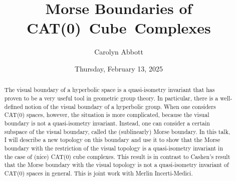 \documentclass{UAmathtalk}
\author{Carolyn Abbott}
\title{Morse Boundaries of CAT(0)~Cube~Complexes}
\date{Thursday, February 13, 2025}
\begin{document}
\maketitle

\begin{abstract}
The visual boundary of a hyperbolic space is a quasi-isometry invariant that has proven to be a very useful tool in geometric group theory. In particular, there is a well-defined notion of the visual boundary of a hyperbolic group. When one considers CAT(0) spaces, however, the situation is more complicated, because the visual boundary is not a quasi-isometry invariant. Instead, one can consider a certain subspace of the visual boundary, called the (sublinearly) Morse boundary. In this talk, I will describe a new topology on this boundary and use it to show that the Morse boundary with the restriction of the visual topology is a quasi-isometry invariant in the case of (nice) CAT(0) cube complexes. This result is in contrast to Cashen’s result that the Morse boundary with the visual topology is not a quasi-isometry invariant of CAT(0) spaces in general. This is joint work with Merlin Incerti-Medici.
\end{abstract}
\end{document}
